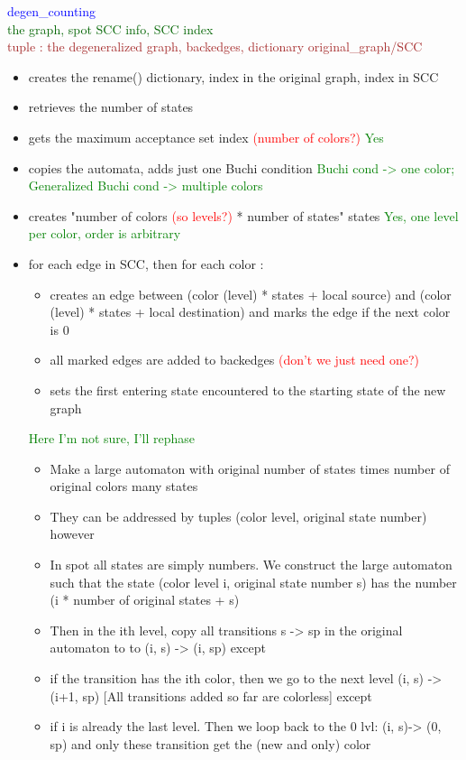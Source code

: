 \documentclass{rapport}
\newcommand{\pscrep}[1]{\textcolor{green}{#1}}
\begin{document}
\textcolor{blue}{degen_counting}\\
\textcolor[HTML]{006400}{the graph, spot SCC info, SCC index}\\
\textcolor{brown}{tuple : the degeneralized graph, backedges, dictionary original_graph/SCC}
\begin{itemize}
    \item creates the rename() dictionary, index in the original graph, index in SCC
    \item retrieves the number of states
    \item gets the maximum acceptance set index \textcolor{red}{(number of colors?)} \pscrep{Yes}
    \item copies the automata, adds just one Buchi condition \pscrep{Buchi cond -> one color; Generalized Buchi cond -> multiple colors}
    \item creates "number of colors \textcolor{red}{(so levels?)} * number of states" states \pscrep{Yes, one level per color, order is arbitrary}
    \item for each edge in SCC, then for each color :
    \begin{itemize}
        \item creates an edge between (color (level) * states + local source) and (color (level) * states + local destination) and marks the edge if the next color is 0
        \item all marked edges are added to backedges \textcolor{red}{(don’t we just need one?)}
        \item sets the first entering state encountered to the starting state of the new graph
    \end{itemize}
    \pscrep{Here I'm not sure, I'll rephase}
    \begin{itemize}
        \item Make a large automaton with original number of states times number of original colors many states
        \item They can be addressed by tuples (color level, original state number) however
        \item In spot all states are simply numbers. We construct the large automaton such that
              the state (color level i, original state number s) has the number (i * number of original states + s)
        \item Then in the ith level, copy all transitions s -> sp in the original automaton to
              to (i, s) -> (i, sp) except
        \item if the transition has the ith color, then we go to the next level (i, s) -> (i+1, sp)
              [All transitions added so far are colorless] except
        \item if i is already the last level. Then we loop back to the 0 lvl: (i, s)-> (0, sp)
              and only these transition get the (new and only) color
    \end{itemize}
\end{itemize}
\end{document}
